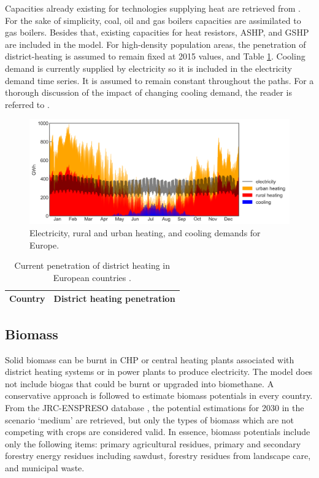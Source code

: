 \documentclass[3p]{elsarticle} %
\begin{document}
Capacities already existing for technologies supplying heat are retrieved from \cite{heating_capacities}. For the sake of simplicity, coal, oil and gas boilers capacities are assimilated to gas boilers. Besides that, existing capacities for heat resistors, ASHP, and GSHP are included in the model. For high-density population areas, the penetration of district-heating is assumed to remain fixed at 2015 values, \cite{DH_penetration} and Table \ref{tab_DH_penetration}. Cooling demand is currently supplied by electricity so it is included in the electricity demand time series. It is assumed to remain constant throughout the paths. For a thorough discussion of the impact of changing cooling demand, the reader is referred to \cite{Zhu_2020}.


\begin{figure}[!h]
	\centering
	\includegraphics[width=0.9\columnwidth]{../figures/demands.png}
	\caption{Electricity, rural and urban heating, and cooling demands for Europe.} \label{fig_demands} 
\end{figure}



\begin{table}[!h]
\footnotesize
\centering
\begin{threeparttable}
\caption{Current penetration of district heating in European countries \cite{DH_penetration}.} \label{tab_DH_penetration}
\centering
\begin{tabularx}{5.5cm}{lc}
\toprule
Country & District heating penetration  \\
\midrule

\bottomrule
\end{tabularx}
\end{threeparttable}
\end{table}


\subsection{Biomass}
Solid biomass can be burnt in CHP or central heating plants associated with district heating systems or in power plants to produce electricity. The model does not include biogas that could be burnt or upgraded into biomethane. A conservative approach is followed to estimate biomass potentials in every country. From the JRC-ENSPRESO database \cite{JRC_biomass, ENSPRESO}, the potential estimations for 2030 in the scenario `medium' are retrieved, but only the types of biomass which are not competing with crops are considered valid. In essence, biomass potentials include only the following items: primary agricultural residues, primary and secondary forestry energy residues including sawdust, forestry residues from landscape care, and municipal waste.
\end{document}
